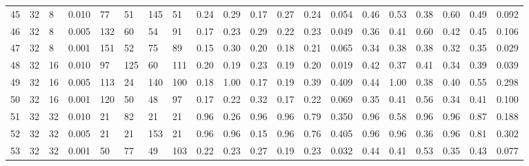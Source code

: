 \begin{landscape}
\begin{longtable}{llllllllllllllllllll}
45 & 32 & 8  & 0.010 & 77  & 51  & 145 & 51  & 0.24 & 0.29 & 0.17 & 0.27 & 0.24 & 0.054 & 0.46 & 0.53 & 0.38 & 0.60 & 0.49 & 0.092 \\
46 & 32 & 8  & 0.005 & 132 & 60  & 54  & 91  & 0.17 & 0.23 & 0.29 & 0.22 & 0.23 & 0.049 & 0.36 & 0.41 & 0.60 & 0.42 & 0.45 & 0.106 \\
47 & 32 & 8  & 0.001 & 151 & 52  & 75  & 89  & 0.15 & 0.30 & 0.20 & 0.18 & 0.21 & 0.065 & 0.34 & 0.38 & 0.38 & 0.32 & 0.35 & 0.029 \\
48 & 32 & 16 & 0.010 & 97  & 125 & 60  & 111 & 0.20 & 0.19 & 0.23 & 0.19 & 0.20 & 0.019 & 0.42 & 0.37 & 0.41 & 0.34 & 0.39 & 0.039 \\
49 & 32 & 16 & 0.005 & 113 & 24  & 140 & 100 & 0.18 & 1.00 & 0.17 & 0.19 & 0.39 & 0.409 & 0.44 & 1.00 & 0.38 & 0.40 & 0.55 & 0.298 \\
50 & 32 & 16 & 0.001 & 120 & 50  & 48  & 97  & 0.17 & 0.22 & 0.32 & 0.17 & 0.22 & 0.069 & 0.35 & 0.41 & 0.56 & 0.34 & 0.41 & 0.100 \\
51 & 32 & 32 & 0.010 & 21  & 82  & 21  & 21  & 0.96 & 0.26 & 0.96 & 0.96 & 0.79 & 0.350 & 0.96 & 0.58 & 0.96 & 0.96 & 0.87 & 0.188 \\
52 & 32 & 32 & 0.005 & 21  & 21  & 153 & 21  & 0.96 & 0.96 & 0.15 & 0.96 & 0.76 & 0.405 & 0.96 & 0.96 & 0.36 & 0.96 & 0.81 & 0.302 \\
53 & 32 & 32 & 0.001 & 50  & 77  & 49  & 103 & 0.22 & 0.23 & 0.27 & 0.19 & 0.23 & 0.032 & 0.44 & 0.41 & 0.53 & 0.35 & 0.43 & 0.077
\end{longtable}
\end{landscape}